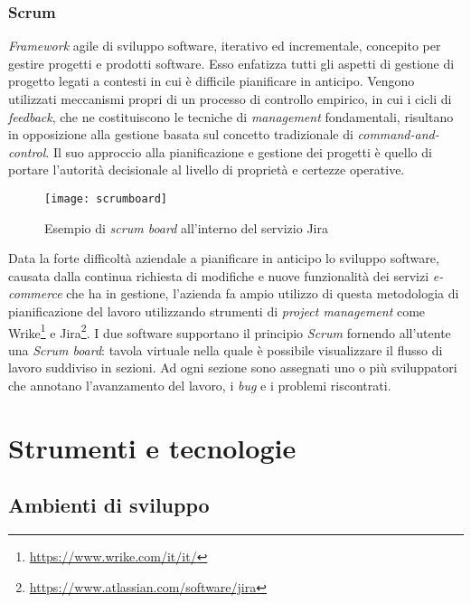 \subsubsection{Scrum}

\textit{Framework} agile di sviluppo software, iterativo ed incrementale, concepito per gestire progetti e prodotti software. Esso enfatizza tutti gli aspetti di gestione di progetto legati a contesti in cui è difficile pianificare in anticipo. Vengono utilizzati meccanismi propri di un processo di controllo empirico, in cui i cicli di \textit{feedback}, che ne costituiscono le tecniche di \textit{management} fondamentali, risultano in opposizione alla gestione basata sul concetto tradizionale di \textit{command-and-control}. Il suo approccio alla pianificazione e gestione dei progetti è quello di portare l'autorità decisionale al livello di proprietà e certezze operative.

\label{Scrum board}
\begin{figure}[ht]
	\begin{center}
		\texttt{[image: scrumboard]}
		\caption{Esempio di \textit{scrum board} all'interno del servizio Jira}
	\end{center}
\end{figure}
\FloatBarrier

Data la forte difficoltà aziendale a pianificare in anticipo lo sviluppo software, causata dalla continua richiesta di modifiche e nuove funzionalità dei servizi \textit{e-commerce} che ha in gestione, l'azienda fa ampio utilizzo di questa metodologia di pianificazione del lavoro utilizzando strumenti di \textit{project management} come Wrike\footnote[6]{\url{https://www.wrike.com/it/it/}} e Jira\footnote[7]{\url{https://www.atlassian.com/software/jira}}. I due software supportano il principio \textit{Scrum} fornendo all'utente una \textit{Scrum board}: tavola virtuale nella quale è possibile visualizzare il flusso di lavoro suddiviso in sezioni. Ad ogni sezione sono assegnati uno o più sviluppatori che annotano l'avanzamento del lavoro, i \textit{bug} e i problemi riscontrati. 

\section{Strumenti e tecnologie}

\subsection{Ambienti di sviluppo}

